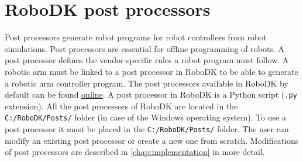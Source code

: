 \section{RoboDK post processors}

Post processors generate robot programs for robot controllers from robot simulations. Post processors are essential for offline programming of robots. A post processor defines the vendor-specific rules a robot program must follow. A robotic arm must be linked to a post processor in RoboDK to be able to generate a robotic arm controller program. The post processors available in RoboDK by default can be found \href{https://robodk.com/doc/en/Post-Processors.html#AvailablePosts}{online}.  
A post processor in RoboDK is a Python script (\texttt{.py} extension). All the post processors of RoboDK are located in the
\texttt{C:/RoboDK/Posts/} folder (in case of the Windows operating system).  To use a post processor it must be placed in the \texttt{C:/RoboDK/Posts/} folder. The user can modify an existing post processor or create a new one from scratch. Modifications of post processors are described in \autoref{chap:implementation} in more detail. 